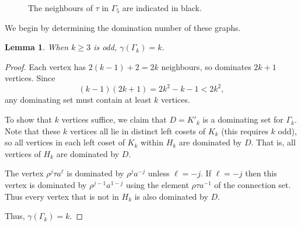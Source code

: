 \documentclass{amsart}
\newtheorem{lem}[thm]{Lemma}
\theoremstyle{remark}
\theoremstyle{definition}
\begin{document}
\begin{figure}
    \qquad
    \caption{The neighbours of $\tau$ in $\Gamma_5$ are indicated in black.}\label{fig2}
\end{figure}

We begin by determining the domination number of these graphs.

\begin{lem}\label{dom-gamma}
    When $k\ge 3$ is odd, $\gamma(\Gamma_k)=k$.
\end{lem}

\begin{proof}
    Each vertex has $2(k-1)+2=2k$ neighbours, so dominates $2k+1$ vertices. Since $$(k-1)(2k+1)=2k^2-k-1<2k^2,$$ any dominating set must contain at least $k$ vertices.

    To show that $k$ vertices suffice, we claim that $D=K'_k$ is a dominating set for $\Gamma_k$. Note that these $k$ vertices all lie in distinct left cosets of $K_k$ (this requires $k$ odd), so  all vertices in each left coset of $K_k$ within $H_k$ are dominated by $D$. That is, all vertices of $H_k$ are dominated by $D$.

    The vertex $\rho^j\tau a^\ell$ is dominated by $\rho^j a^{-j}$ unless $\ell=-j$. If $\ell=-j$ then this vertex is dominated by $\rho^{j-1}a^{1-j}$ using the element $\rho\tau a^{-1}$ of the connection set. Thus every vertex that is not in $H_k$ is also dominated by $D$.

    Thus, $\gamma(\Gamma_k)=k$.
\end{proof}
\end{document}
